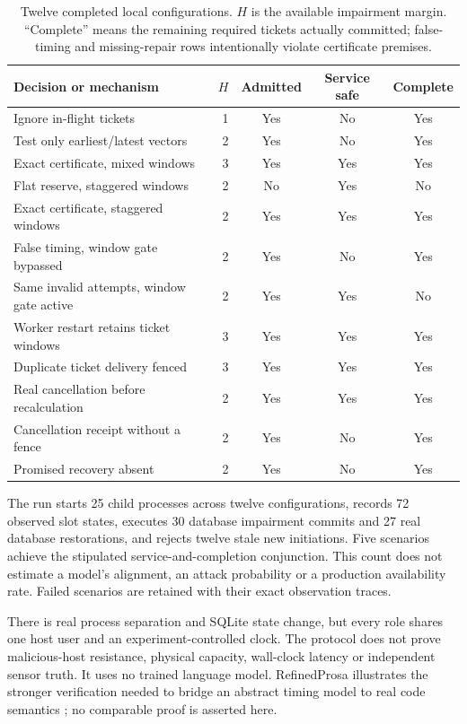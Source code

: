 \begin{table}[t]
\centering\small
\caption{Twelve completed local configurations. $H$ is the available impairment margin. ``Complete'' means the remaining required tickets actually committed; false-timing and missing-repair rows intentionally violate certificate premises.}
\label{tab:protocol}
\begin{tabularx}{\linewidth}{@{}Xrccc@{}}\toprule
Decision or mechanism & $H$ & Admitted & Service safe & Complete\\\midrule
Ignore in-flight tickets &1&Yes&No&Yes\\
Test only earliest/latest vectors &2&Yes&No&Yes\\
Exact certificate, mixed windows &3&Yes&Yes&Yes\\
Flat reserve, staggered windows &2&No&Yes&No\\
Exact certificate, staggered windows &2&Yes&Yes&Yes\\
False timing, window gate bypassed &2&Yes&No&Yes\\
Same invalid attempts, window gate active &2&Yes&Yes&No\\
Worker restart retains ticket windows &3&Yes&Yes&Yes\\
Duplicate ticket delivery fenced &3&Yes&Yes&Yes\\
Real cancellation before recalculation &2&Yes&Yes&Yes\\
Cancellation receipt without a fence &2&Yes&No&Yes\\
Promised recovery absent &2&Yes&No&Yes\\\bottomrule
\end{tabularx}
\end{table}
The run starts 25 child processes across twelve configurations, records 72 observed slot states, executes 30 database impairment commits and 27 real database restorations, and rejects twelve stale new initiations. Five scenarios achieve the stipulated service-and-completion conjunction. This count does not estimate a model's alignment, an attack probability or a production availability rate. Failed scenarios are retained with their exact observation traces.

There is real process separation and SQLite state change, but every role shares one host user and an experiment-controlled clock. The protocol does not prove malicious-host resistance, physical capacity, wall-clock latency or independent sensor truth. It uses no trained language model. RefinedProsa illustrates the stronger verification needed to bridge an abstract timing model to real code semantics \cite{refinedprosa}; no comparable proof is asserted here.


